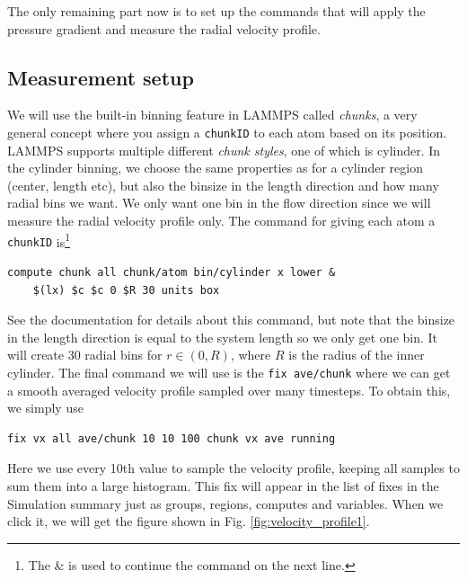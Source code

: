 \documentclass[aps,pre,twocolumn,letterpaper,floatfix,nofootinbib]{revtex4}
\newcommand{\code}[1]{\colorbox{light-gray}{\color{RawSienna}\texttt{#1}}}
\begin{document}
The only remaining part now is to set up the commands that will apply the pressure gradient and measure the radial velocity profile.

\subsection{Measurement setup}
We will use the built-in binning feature in LAMMPS called \textit{chunks}, a very general concept where you assign a \code{chunkID} to each atom
based on its position. LAMMPS supports multiple different \textit{chunk styles}, one of which is cylinder.
In the cylinder binning, we choose the same properties as for a cylinder region (center, length etc), but also the binsize in the length direction and how many radial bins we want.
We only want one bin in the flow direction since we will measure the radial velocity profile only.
The command for giving each atom a \code{chunkID} is\footnote{The \& is used to continue the command on the next line.}
\begin{lstlisting}[basicstyle=\tiny, frame = none, numbers=none, framexleftmargin=0pt, xleftmargin=-0.75cm, xrightmargin=0.0cm]
	compute chunk all chunk/atom bin/cylinder x lower &
	$(lx) $c $c 0 $R 30 units box
\end{lstlisting}
See the documentation for details about this command, but note that the binsize in the length direction is equal to the system length so we only get one bin.
It will create 30 radial bins for $r\in (0, R)$, where $R$ is the radius of the inner cylinder.
The final command we will use is the \code{fix ave/chunk} where we can get a smooth averaged velocity profile sampled over many timesteps.
To obtain this, we simply use
\begin{lstlisting}[basicstyle=\tiny, frame = none, numbers=none, framexleftmargin=0pt, xleftmargin=-0.75cm, xrightmargin=0.0cm]
	fix vx all ave/chunk 10 10 100 chunk vx ave running
\end{lstlisting}
Here we use every 10th value to sample the velocity profile, keeping all samples to sum them into a large histogram.
This fix will appear in the list of fixes in the Simulation summary just as groups, regions, computes and variables.
When we click it, we will get the figure shown in Fig. \ref{fig:velocity_profile1}.
\end{document}

